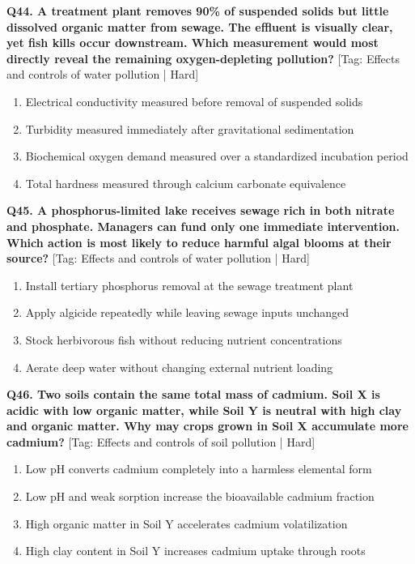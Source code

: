 \noindent\textbf{Q44. A treatment plant removes 90\% of suspended solids but little dissolved organic matter from sewage. The effluent is visually clear, yet fish kills occur downstream. Which measurement would most directly reveal the remaining oxygen-depleting pollution?} \hfill [Tag: Effects and controls of water pollution | Hard]
\begin{enumerate}[label=(\alph*),topsep=2pt,itemsep=1pt,partopsep=0pt,parsep=0pt]
    \item {Electrical conductivity measured before removal of suspended solids}
    \item {Turbidity measured immediately after gravitational sedimentation}
    \item {Biochemical oxygen demand measured over a standardized incubation period}
    \item {Total hardness measured through calcium carbonate equivalence}
\end{enumerate}
\vspace{2mm}

\noindent\textbf{Q45. A phosphorus-limited lake receives sewage rich in both nitrate and phosphate. Managers can fund only one immediate intervention. Which action is most likely to reduce harmful algal blooms at their source?} \hfill [Tag: Effects and controls of water pollution | Hard]
\begin{enumerate}[label=(\alph*),topsep=2pt,itemsep=1pt,partopsep=0pt,parsep=0pt]
    \item {Install tertiary phosphorus removal at the sewage treatment plant}
    \item {Apply algicide repeatedly while leaving sewage inputs unchanged}
    \item {Stock herbivorous fish without reducing nutrient concentrations}
    \item {Aerate deep water without changing external nutrient loading}
\end{enumerate}
\vspace{2mm}

\noindent\textbf{Q46. Two soils contain the same total mass of cadmium. Soil X is acidic with low organic matter, while Soil Y is neutral with high clay and organic matter. Why may crops grown in Soil X accumulate more cadmium?} \hfill [Tag: Effects and controls of soil pollution | Hard]
\begin{enumerate}[label=(\alph*),topsep=2pt,itemsep=1pt,partopsep=0pt,parsep=0pt]
    \item {Low pH converts cadmium completely into a harmless elemental form}
    \item {Low pH and weak sorption increase the bioavailable cadmium fraction}
    \item {High organic matter in Soil Y accelerates cadmium volatilization}
    \item {High clay content in Soil Y increases cadmium uptake through roots}
\end{enumerate}
\vspace{2mm}

